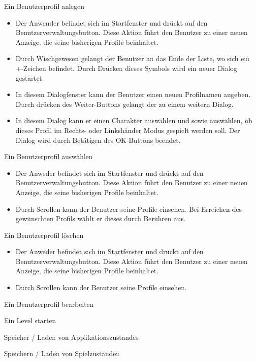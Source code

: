 \documentclass{scrartcl}
\begin{document}
\begin{telist}
	\item Ein Benutzerprofil anlegen
	\begin{itemize}
		\item Der Anwender befindet sich im Startfenster und drückt auf den \glqq Benutzerverwaltungsbutton\grqq. Diese Aktion führt den Benutzer zu einer neuen Anzeige, die seine bisherigen Profile beinhaltet.
		\item Durch Wischgewesen gelangt der Benutzer an das Ende der Liste, wo sich ein \glqq +\grqq-Zeichen befindet. Durch Drücken dieses Symbols wird ein neuer Dialog gestartet.
		\item In diesem Dialogfenster kann der Benutzer einen neuen Profilnamen angeben. Durch drücken des \glqq Weiter\grqq-Buttons gelangt der zu einem weitern Dialog.
		\item In diesem Dialog kann er einen Charakter auswählen und sowie auswählen, ob dieses Profil im Rechts- oder Linkshänder Modus gespielt werden soll. Der Dialog wird durch Betätigen des \glqq OK\grqq-Buttons beendet.
	\end{itemize}
	\item Ein Benutzerprofil auswählen
	\begin{itemize}
		\item Der Anweder befindet sich im Startfenster und drückt auf den \glqq Benutzerverwaltungsbutton\grqq. Diese Aktion führt den Benutzer zu einer neuen Anzeige, die seine bisherigen Profile beinhaltet.
		\item Durch Scrollen kann der Benutzer seine Profile einsehen. Bei Erreichen des gewünschten Profils wählt er dieses durch Berühren aus.
	\end{itemize}
	\item Ein Benutzerprofil löschen
	\begin{itemize}
		\item Der Anweder befindet sich im Startfenster und drückt auf den \glqq Benutzerverwaltungsbutton\grqq. Diese Aktion führt den Benutzer zu einer neuen Anzeige, die seine bisherigen Profile beinhaltet.
		\item Durch Scrollen kann der Benutzer seine Profile einsehen. 
	\end{itemize}
	\item Ein Benutzerprofil bearbeiten
	\item Ein Level starten
	\item Speicher / Laden von Applikationszustandes
	\item Speichern / Laden von Spielzuständen
	
	\item 
\end{telist}
\end{document}
